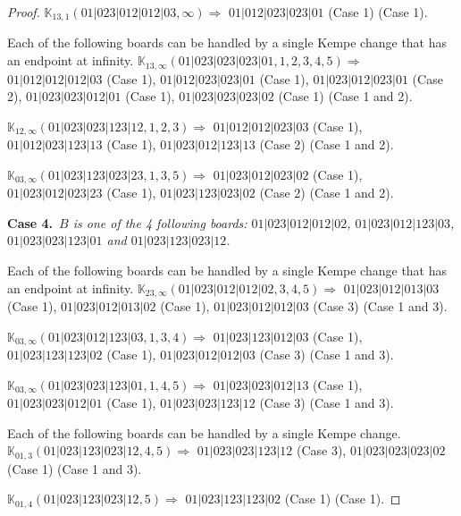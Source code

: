 \documentclass[12pt]{article}
\newcommand{\K}{\mathbb{K}}
\newcommand{\case}[2]{{\bf Case #1.}~{\it #2}~~}
\begin{document}
\begin{proof}
$\K_{13,1}(01|023|012|012|03,\infty)\Rightarrow $ $01|012|023|023|01$ (Case 1) (Case 1).


\bigskip

Each of the following boards can be handled by a single Kempe change that has an endpoint at infinity.
$\K_{13,\infty}(01|023|023|023|01,1, 2, 3, 4, 5)\Rightarrow $ $01|012|012|012|03$ (Case 1), $01|012|023|023|01$ (Case 1), $01|023|012|023|01$ (Case 2), $01|023|023|012|01$ (Case 1), $01|023|023|023|02$ (Case 1) (Case 1 and 2).

\bigskip

$\K_{12,\infty}(01|023|023|123|12,1, 2, 3)\Rightarrow $ $01|012|012|023|03$ (Case 1), $01|012|023|123|13$ (Case 1), $01|023|012|123|13$ (Case 2) (Case 1 and 2).

\bigskip

$\K_{03,\infty}(01|023|123|023|23,1, 3, 5)\Rightarrow $ $01|023|012|023|02$ (Case 1), $01|023|012|023|23$ (Case 1), $01|023|123|023|02$ (Case 2) (Case 1 and 2).

\bigskip


\bigskip
\case{4}{$B$ is one of the 4 following boards:
 $01|023|012|012|02$, $01|023|012|123|03$, $01|023|023|123|01$ and $01|023|123|023|12$.}

\bigskip

Each of the following boards can be handled by a single Kempe change that has an endpoint at infinity.
$\K_{23,\infty}(01|023|012|012|02,3, 4, 5)\Rightarrow $ $01|023|012|013|03$ (Case 1), $01|023|012|013|02$ (Case 1), $01|023|012|012|03$ (Case 3) (Case 1 and 3).

\bigskip

$\K_{03,\infty}(01|023|012|123|03,1, 3, 4)\Rightarrow $ $01|023|123|012|03$ (Case 1), $01|023|123|123|02$ (Case 1), $01|023|012|012|03$ (Case 3) (Case 1 and 3).

\bigskip

$\K_{03,\infty}(01|023|023|123|01,1, 4, 5)\Rightarrow $ $01|023|023|012|13$ (Case 1), $01|023|023|012|01$ (Case 1), $01|023|023|123|12$ (Case 3) (Case 1 and 3).

\bigskip

\bigskip

Each of the following boards can be handled by a single Kempe change.
$\K_{01,3}(01|023|123|023|12,4, 5)\Rightarrow $ $01|023|023|123|12$ (Case 3), $01|023|023|023|02$ (Case 1) (Case 1 and 3).

$\K_{01,4}(01|023|123|023|12,5)\Rightarrow $ $01|023|123|123|02$ (Case 1) (Case 1).



\end{proof}
\end{document}
